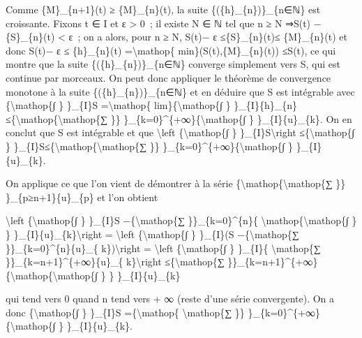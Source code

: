 \documentclass[]{article}
\begin{document}
Comme \{M\}\_\{n+1\}(t) ≥ \{M\}\_\{n\}(t), la suite
\{(\{h\}\_\{n\})\}\_\{n∈ℕ\} est croissante. Fixons t ∈ I et ε
\textgreater{} 0~; il existe N ∈ ℕ tel que n ≥ N ⇒\textbar{}S(t) −
\{S\}\_\{n\}(t)\textbar{} \textless{} ε~; on a alors, pour n ≥ N,
\textbar{}S(t)\textbar{}− ε ≤\textbar{}\{S\}\_\{n\}(t)\textbar{}≤
\{M\}\_\{n\}(t) et donc \textbar{}S(t)\textbar{}− ε ≤ \{h\}\_\{n\}(t)
=\textbackslash{}mathop\{
min\}(\textbar{}S(t)\textbar{},\{M\}\_\{n\}(t))
≤\textbar{}S(t)\textbar{}, ce qui montre que la suite
\{(\{h\}\_\{n\})\}\_\{n∈ℕ\} converge simplement vers
\textbar{}S\textbar{}, qui est continue par morceaux. On peut donc
appliquer le théorème de convergence monotone à la suite
\{(\{h\}\_\{n\})\}\_\{n∈ℕ\} et en déduire que \textbar{}S\textbar{} est
intégrable avec \{\textbackslash{}mathop\{∫ \}
\}\_\{I\}\textbar{}S\textbar{} =\textbackslash{}mathop\{
lim\}\{\textbackslash{}mathop\{∫ \} \}\_\{I\}\{h\}\_\{n\}
≤\{\textbackslash{}mathop\{\textbackslash{}mathop\{∑ \}\}
\}\_\{k=0\}\^{}\{+∞\}\{\textbackslash{}mathop\{∫ \}
\}\_\{I\}\textbar{}\{u\}\_\{k\}\textbar{}. On en conclut que S est
intégrable et que \textbackslash{}left
\textbar{}\{\textbackslash{}mathop\{∫ \} \}\_\{I\}S\textbackslash{}right
\textbar{}≤\{\textbackslash{}mathop\{∫ \}
\}\_\{I\}\textbar{}S\textbar{}≤\{\textbackslash{}mathop\{\textbackslash{}mathop\{∑
\}\} \}\_\{k=0\}\^{}\{+∞\}\{\textbackslash{}mathop\{∫ \}
\}\_\{I\}\textbar{}\{u\}\_\{k\}\textbar{}.

On applique ce que l'on vient de démontrer à la série
\{\textbackslash{}mathop\{\textbackslash{}mathop\{∑ \}\}
\}\_\{p≥n+1\}\{u\}\_\{p\} et l'on obtient

\textbackslash{}left \textbar{}\{\textbackslash{}mathop\{∫ \} \}\_\{I\}S
−\{\textbackslash{}mathop\{∑ \}\}\_\{k=0\}\^{}\{n\}\{
\textbackslash{}mathop\{\textbackslash{}mathop\{∫ \} \}
\}\_\{I\}\{u\}\_\{k\}\textbackslash{}right \textbar{} =
\textbackslash{}left \textbar{}\{\textbackslash{}mathop\{∫ \}
\}\_\{I\}(S −\{\textbackslash{}mathop\{∑ \}\}\_\{k=0\}\^{}\{n\}\{u\}\_\{
k\})\textbackslash{}right \textbar{} = \textbackslash{}left
\textbar{}\{\textbackslash{}mathop\{∫ \} \}\_\{I\}\{
\textbackslash{}mathop\{∑ \}\}\_\{k=n+1\}\^{}\{+∞\}\{u\}\_\{
k\}\textbackslash{}right \textbar{}≤\{\textbackslash{}mathop\{∑
\}\}\_\{k=n+1\}\^{}\{+∞\}\{\textbackslash{}mathop\{\textbackslash{}mathop\{∫
\} \} \}\_\{I\}\textbar{}\{u\}\_\{k\}\textbar{}

qui tend vers 0 quand n tend vers + ∞ (reste d'une série convergente).
On a donc \{\textbackslash{}mathop\{∫ \} \}\_\{I\}S
=\{\textbackslash{}mathop\{ \textbackslash{}mathop\{∑ \}\}
\}\_\{k=0\}\^{}\{+∞\}\{\textbackslash{}mathop\{∫ \}
\}\_\{I\}\{u\}\_\{k\}.
\end{document}

